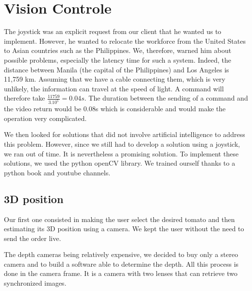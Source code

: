 \section{Vision Controle}\insertloftspace
\setcounter{figure}{0}\setcounter{table}{0}

The joystick was an explicit request from our client that he wanted us to implement. However, he wanted to relocate the workforce from the United States to Asian countries such as the Philippines. We, therefore, warned him about possible problems, especially the latency time for such a system. Indeed, the distance between Manila (the capital of the Philippines) and Los Angeles is 11,759 km. Assuming that we have a cable connecting them, which is very unlikely, the information can travel at the speed of light. A command will therefore take $\displaystyle{\frac{11759}{3.10^5}=0.04s}$. The duration between the sending of a command and the video return would be 0.08s which is considerable and would make the operation very complicated.

\bigbreak
We then looked for solutions that did not involve artificial intelligence to address this problem. However, since we still had to develop a solution using a joystick, we ran out of time. It is nevertheless a promising solution. To implement these solutions, we used the python openCV library. We trained ourself thanks to a python book and youtube channels.

\subsection{3D position}

Our first one consisted in making the user select the desired tomato and then estimating its 3D position using a camera. We kept the user without the need to send the order live. 

\bigbreak
The depth cameras being relatively expensive, we decided to buy only a stereo camera and to build a software able to determine the depth. All this process is done in the camera frame. It is a camera with two lenses that can retrieve two synchronized images.

